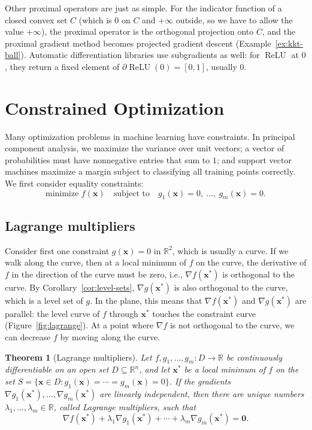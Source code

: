 \documentclass[11pt]{article}
\theoremstyle{definition}
\theoremstyle{plain}
\newtheorem{theorem}[definition]{Theorem}
\theoremstyle{remark}
\DeclareMathOperator{\ReLU}{ReLU}
\begin{document}
Other proximal operators are just as simple. For the indicator function of a closed convex set $C$ (which is $0$ on $C$ and $+\infty$ outside, so we have to allow the value $+\infty$), the proximal operator is the orthogonal projection onto $C$, and the proximal gradient method becomes projected gradient descent (Example~\ref{ex:kkt-ball}). Automatic differentiation libraries use subgradients as well: for $\ReLU$ at $0$, they return a fixed element of $\partial\ReLU(0) = [0, 1]$, usually $0$.

\section{Constrained Optimization}\label{sec:constrained}

Many optimization problems in machine learning have constraints. In principal component analysis, we maximize the variance over unit vectors; a vector of probabilities must have nonnegative entries that sum to $1$; and support vector machines maximize a margin subject to classifying all training points correctly. We first consider equality constraints:
\[\text{minimize } f(\mathbf{x}) \quad \text{subject to} \quad g_1(\mathbf{x}) = 0, \ \ldots, \ g_m(\mathbf{x}) = 0.\]

\subsection{Lagrange multipliers}

Consider first one constraint $g(\mathbf{x}) = 0$ in $\mathbb{R}^2$, which is usually a curve. If we walk along the curve, then at a local minimum of $f$ on the curve, the derivative of $f$ in the direction of the curve must be zero, i.e., $\nabla f(\mathbf{x}^*)$ is orthogonal to the curve. By Corollary~\ref{cor:level-sets}, $\nabla g(\mathbf{x}^*)$ is also orthogonal to the curve, which is a level set of $g$. In the plane, this means that $\nabla f(\mathbf{x}^*)$ and $\nabla g(\mathbf{x}^*)$ are parallel: the level curve of $f$ through $\mathbf{x}^*$ touches the constraint curve (Figure~\ref{fig:lagrange}). At a point where $\nabla f$ is not orthogonal to the curve, we can decrease $f$ by moving along the curve.

\begin{theorem}[Lagrange multipliers]\label{thm:lagrange}
    Let $f, g_1, \ldots, g_m: D \to \mathbb{R}$ be continuously differentiable on an open set $D \subseteq \mathbb{R}^n$, and let $\mathbf{x}^*$ be a local minimum of $f$ on the set $S = \{\mathbf{x} \in D : g_1(\mathbf{x}) = \cdots = g_m(\mathbf{x}) = 0\}$. If the gradients $\nabla g_1(\mathbf{x}^*), \ldots, \nabla g_m(\mathbf{x}^*)$ are linearly independent, then there are unique numbers $\lambda_1, \ldots, \lambda_m \in \mathbb{R}$, called Lagrange multipliers, such that
    \[\nabla f(\mathbf{x}^*) + \lambda_1\nabla g_1(\mathbf{x}^*) + \cdots + \lambda_m\nabla g_m(\mathbf{x}^*) = \mathbf{0}.\]
\end{theorem}
\end{document}
